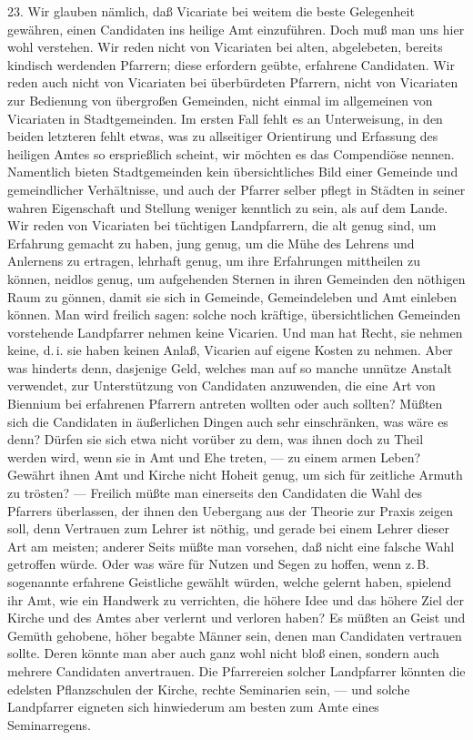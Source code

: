 23. Wir glauben nämlich, daß Vicariate bei weitem die beste Gelegenheit gewähren, einen Candidaten ins heilige Amt einzuführen. Doch muß man uns hier wohl verstehen. Wir reden nicht von Vicariaten bei alten, abgelebeten, bereits kindisch werdenden Pfarrern; diese erfordern geübte, erfahrene Candidaten. Wir reden auch nicht von Vicariaten bei überbürdeten Pfarrern, nicht von Vicariaten zur Bedienung von übergroßen Gemeinden, nicht einmal im allgemeinen von Vicariaten in Stadtgemeinden. Im ersten Fall fehlt es an Unterweisung, in den beiden letzteren fehlt etwas, was zu allseitiger Orientirung und Erfassung des heiligen Amtes so ersprießlich scheint, wir möchten es das Compendiöse nennen. Namentlich bieten Stadtgemeinden kein übersichtliches Bild einer Gemeinde und gemeindlicher Verhältnisse, und auch der Pfarrer selber pflegt in Städten in seiner wahren Eigenschaft und Stellung weniger kenntlich zu sein, als auf dem Lande. Wir reden von Vicariaten bei tüchtigen Landpfarrern, die alt genug sind, um Erfahrung gemacht zu haben, jung genug, um die Mühe des Lehrens und Anlernens zu ertragen, lehrhaft genug, um ihre Erfahrungen mittheilen zu können, neidlos genug, um aufgehenden Sternen in ihren Gemeinden den nöthigen Raum zu gönnen, damit sie sich in Gemeinde, Gemeindeleben und Amt einleben können. Man wird freilich sagen: solche noch kräftige, übersichtlichen Gemeinden vorstehende Landpfarrer nehmen keine Vicarien. Und man hat Recht, sie nehmen keine, d.\,i. sie haben keinen Anlaß, Vicarien auf eigene Kosten zu nehmen. Aber was hinderts denn, dasjenige Geld, welches man auf so manche unnütze
Anstalt verwendet, zur Unterstützung von Candidaten anzuwenden, die eine Art von Biennium bei erfahrenen Pfarrern antreten wollten oder auch sollten? Müßten sich die Candidaten in äußerlichen Dingen auch sehr einschränken, was wäre es denn? Dürfen sie sich etwa nicht vorüber zu dem, was ihnen doch zu Theil werden wird, wenn sie in Amt und Ehe treten, — zu einem armen Leben? Gewährt ihnen Amt und Kirche nicht Hoheit genug, um sich für zeitliche Armuth zu trösten? — Freilich müßte man einerseits den Candidaten die Wahl des Pfarrers überlassen, der ihnen den Uebergang aus der Theorie zur Praxis zeigen soll, denn Vertrauen zum Lehrer ist nöthig, und gerade bei einem Lehrer dieser Art am meisten; anderer Seits müßte man vorsehen, daß nicht eine falsche Wahl getroffen würde. Oder was wäre für Nutzen und Segen zu hoffen, wenn z.\,B. sogenannte erfahrene Geistliche gewählt würden, welche gelernt haben, spielend ihr Amt, wie ein Handwerk zu verrichten, die höhere Idee und das höhere Ziel der Kirche und des Amtes aber verlernt und verloren haben? Es müßten an Geist und Gemüth gehobene, höher begabte Männer sein, denen man Candidaten vertrauen sollte. Deren könnte man aber auch ganz wohl nicht bloß einen, sondern auch mehrere Candidaten anvertrauen. Die Pfarrereien solcher Landpfarrer könnten die edelsten Pflanzschulen der Kirche, rechte Seminarien sein, — und solche Landpfarrer eigneten sich hinwiederum am besten zum Amte eines Seminarregens.

